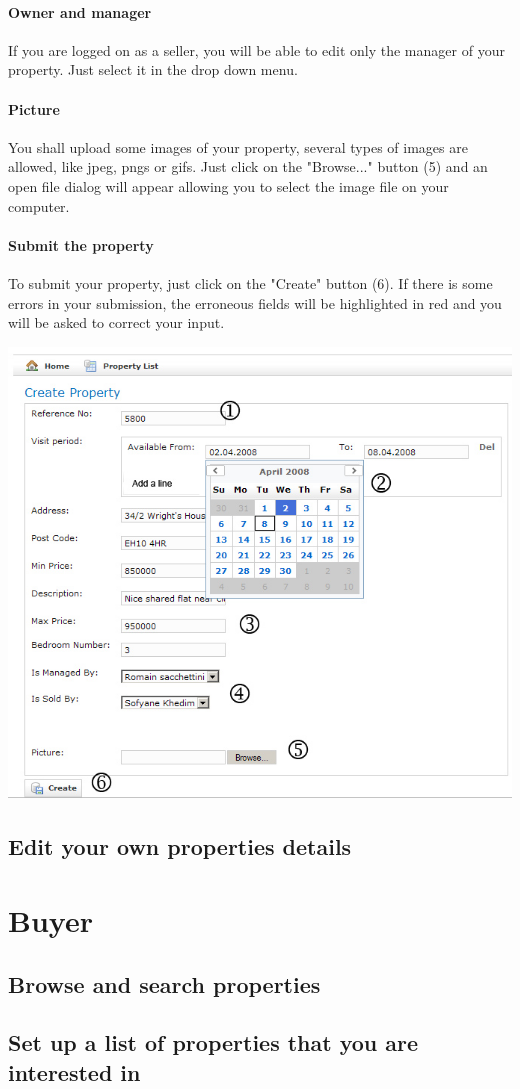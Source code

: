 \documentclass[a4paper,12pt]{article}
\begin{document}
\paragraph{Owner and manager}

If you are logged on as a seller, you will be able to edit only the manager of your property. Just select it in the drop down menu.

\paragraph{Picture}

You shall upload some images of your property, several types of images are allowed, like jpeg, pngs or gifs.
Just click on the "Browse..." button (5) and an open file dialog will appear allowing you to select the image file on your computer.

\paragraph{Submit the property}
To submit your property, just click on the "Create" button (6). If there is some errors in your submission, the erroneous fields will be highlighted in red and you will be asked to correct your input.


\begin{center}
\includegraphics[scale=0.7]{pics/step_by_step.jpg}
\end{center}
\subsection{Edit your own properties details}

\section{Buyer}
\subsection{Browse and search properties}
\subsection{Set up a list of properties that you are interested in}
\end{document}
